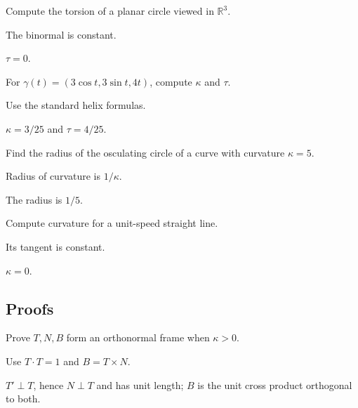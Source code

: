 \begin{exercise}\label{exr:vii13-ped-02}
Compute the torsion of a planar circle viewed in \(\mathbb R^3\).
\end{exercise}
\begin{hint}
The binormal is constant.
\end{hint}
\begin{solution}
\(\tau=0\).
\end{solution}

\begin{exercise}\label{exr:vii13-ped-03}
For \(\gamma(t)=(3\cos t,3\sin t,4t)\), compute \(\kappa\) and \(\tau\).
\end{exercise}
\begin{hint}
Use the standard helix formulas.
\end{hint}
\begin{solution}
\(\kappa=3/25\) and \(\tau=4/25\).
\end{solution}

\begin{exercise}\label{exr:vii13-ped-04}
Find the radius of the osculating circle of a curve with curvature \(\kappa=5\).
\end{exercise}
\begin{hint}
Radius of curvature is \(1/\kappa\).
\end{hint}
\begin{solution}
The radius is \(1/5\).
\end{solution}

\begin{exercise}\label{exr:vii13-ped-05}
Compute curvature for a unit-speed straight line.
\end{exercise}
\begin{hint}
Its tangent is constant.
\end{hint}
\begin{solution}
\(\kappa=0\).
\end{solution}

\subsection*{Proofs}

\begin{exercise}\label{exr:vii13-ped-06}
Prove \(T,N,B\) form an orthonormal frame when \(\kappa>0\).
\end{exercise}
\begin{hint}
Use \(T\cdot T=1\) and \(B=T\times N\).
\end{hint}
\begin{solution}
\(T'\perp T\), hence \(N\perp T\) and has unit length; \(B\) is the unit cross product orthogonal to both.
\end{solution}


